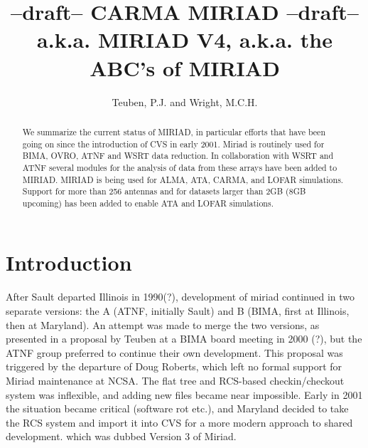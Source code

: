 


\title{
--draft-- {\Large  {\bf CARMA MIRIAD} } --draft--\\
{\footnotesize a.k.a. MIRIAD V4, a.k.a. the ABC's of MIRIAD}}
\medskip

\author{ Teuben, P.J. and Wright, M.C.H.}


\begin{abstract}
 
We summarize the current status of MIRIAD, in particular efforts that
have been going on since the introduction of CVS in early 2001.  Miriad
is routinely used for BIMA, OVRO, ATNF and WSRT data reduction.  In
collaboration with WSRT and ATNF several modules for the analysis of
data from these arrays have been added to MIRIAD.  MIRIAD is being used
for ALMA, ATA, CARMA, and LOFAR simulations.  Support for more than 256
antennas and for datasets larger than 2GB (8GB upcoming) has been added
to enable ATA and LOFAR simulations.


\end{abstract}

\section{Introduction}

After Sault departed Illinois in 1990(?), development of 
miriad continued in two separate versions: the A (ATNF, initially
Sault) and B (BIMA,  first at Illinois, then at Maryland). An attempt was made
to merge the two versions,
as presented in a proposal by Teuben at a BIMA board meeting in 2000 (?), but
the ATNF group preferred to continue their own development. This proposal
was triggered by the departure of Doug Roberts, which
left no formal support for Miriad 
maintenance at NCSA. 
The flat tree and RCS-based checkin/checkout system was 
inflexible, and adding new files became near impossible. 
Early in 2001 the situation became critical (software rot etc.), and 
Maryland decided to take the RCS
system and import it into CVS for a more modern approach to shared
development. which was dubbed Version 3 of Miriad.


